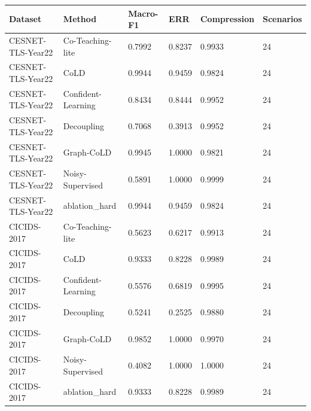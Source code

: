 \small
\begin{tabular}{llllll}
\hline
Dataset & Method & Macro-F1 & ERR & Compression & Scenarios \\
\hline
CESNET-TLS-Year22 & Co-Teaching-lite & 0.7992 & 0.8237 & 0.9933 & 24 \\
CESNET-TLS-Year22 & CoLD & 0.9944 & 0.9459 & 0.9824 & 24 \\
CESNET-TLS-Year22 & Confident-Learning & 0.8434 & 0.8444 & 0.9952 & 24 \\
CESNET-TLS-Year22 & Decoupling & 0.7068 & 0.3913 & 0.9952 & 24 \\
CESNET-TLS-Year22 & Graph-CoLD & 0.9945 & 1.0000 & 0.9821 & 24 \\
CESNET-TLS-Year22 & Noisy-Supervised & 0.5891 & 1.0000 & 0.9999 & 24 \\
CESNET-TLS-Year22 & ablation\_hard & 0.9944 & 0.9459 & 0.9824 & 24 \\
CICIDS-2017 & Co-Teaching-lite & 0.5623 & 0.6217 & 0.9913 & 24 \\
CICIDS-2017 & CoLD & 0.9333 & 0.8228 & 0.9989 & 24 \\
CICIDS-2017 & Confident-Learning & 0.5576 & 0.6819 & 0.9995 & 24 \\
CICIDS-2017 & Decoupling & 0.5241 & 0.2525 & 0.9880 & 24 \\
CICIDS-2017 & Graph-CoLD & 0.9852 & 1.0000 & 0.9970 & 24 \\
CICIDS-2017 & Noisy-Supervised & 0.4082 & 1.0000 & 1.0000 & 24 \\
CICIDS-2017 & ablation\_hard & 0.9333 & 0.8228 & 0.9989 & 24 \\
\hline
\end{tabular}
